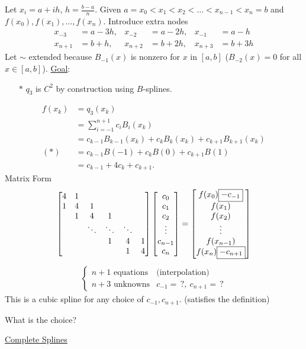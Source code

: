 \documentclass[]{article}
\begin{document}
Let $x_i=a+ih$, $h=\frac{b-a}n$.
Given $a = x_0 < x_1 < x_2 < \dots < x_{n-1} < x_n = b$ and $f(x_0),f(x_1),\dots,f(x_n)$.
Introduce extra  nodes
\begin{align*}
	x_{-3} &= a-3h, & x_{-2} &= a-2h, & x_{-1} &= a-h \\
	x_{n+1} &= b+h, & x_{n+2} &= b+2h, & x_{n+3} &= b+3h
\end{align*}
Let  $\sim$ extended because $B_{-1}(x)$ is nonzero for $x$ in $[a,b]$ ($B_{-2}(x)=0$ for all $x\in[a,b]$).
\ul{Goal}: 
\begin{enumerate}
	\item[$*$] $q_3$ is $C^2$ by construction using $B$-splines.
\end{enumerate}
\begin{align*}
	f(x_k) &= q_3(x_k) \\
		   &= \sum_{i=-1}^{n+1} c_i B_i(x_k) \\
		   &= c_{k-1} B_{k-1}(x_k) + c_k B_k(x_k) + c_{k+1} B_{k+1}(x_k) \\
	(*)    &= c_{k-1} B(-1) + c_k B(0) + c_{k+1} B(1) \\
		   &= c_{k-1} + 4 c_k + c_{k+1}.
\end{align*}
Matrix Form
$$ \begin{bmatrix}
	4 & 1 & & & & \\
	1 & 4 & 1 & & & \\
	  & 1 & 4 & 1 &  &\\
	  &   & \ddots & \ddots & \ddots & \\
	  &   &   &  1 & 4 & 1 \\
	  &   &   &    & 1 & 4\end{bmatrix} \begin{bmatrix}c_0\\c_1\\c_2\\\vdots\\c_{n-1}\\c_n\end{bmatrix} = \begin{bmatrix}f(x_0) \fbox{$-c_{-1}$} \\ f(x_1) \\ f(x_2) \\ \vdots \\ f(x_{n-1}) \\ f(x_n)\fbox{$-c_{n+1}$}\end{bmatrix} $$
\begin{align*}
	\begin{cases}
		n+1 \text{ equations} & \text{(interpolation)} \\
		n+3 \text{ unknowns} & c_{-1} = \, ?,\ c_{n+1} = \, ?
	\end{cases}
\end{align*}
This is a cubic spline for any choice of $c_{-1},c_{n+1}$.
(satisfies the definition)
\begin{question}
	What is the  choice?
\end{question}
\ul{Complete Splines}
\end{document}
